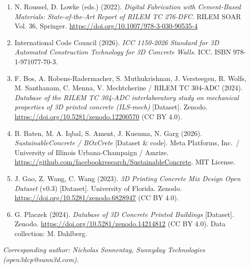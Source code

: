 \documentclass[
  11pt,
  letterpaper,
]{article}
\begin{document}
\begin{enumerate}
\item
  N. Roussel, D. Lowke (eds.) (2022). \emph{Digital Fabrication with
  Cement-Based Materials: State-of-the-Art Report of RILEM TC 276-DFC.}
  RILEM SOAR Vol. 36, Springer.
  \url{https://doi.org/10.1007/978-3-030-90535-4}
\item
  International Code Council (2026). \emph{ICC 1150-2026 Standard for 3D
  Automated Construction Technology for 3D Concrete Walls.} ICC. ISBN
  978-1-971077-70-3.
\item
  F. Bos, A. Robens-Radermacher, S. Muthukrishnan, J. Versteegen, R.
  Wolfs, M. Santhanam, C. Menna, V. Mechtcherine / RILEM TC 304-ADC
  (2024). \emph{Database of the RILEM TC 304-ADC interlaboratory study
  on mechanical properties of 3D printed concrete (ILS-mech)}
  {[}Dataset{]}. Zenodo. \url{https://doi.org/10.5281/zenodo.12200570}
  (CC BY 4.0).
\item
  B. Baten, M. A. Iqbal, S. Ament, J. Kusuma, N. Garg (2026).
  \emph{SustainableConcrete / BOxCrete} {[}Dataset \& code{]}. Meta
  Platforms, Inc.~/ University of Illinois Urbana-Champaign / Amrize.
  \url{https://github.com/facebookresearch/SustainableConcrete}. MIT
  License.
\item
  J. Gao, Z. Wang, C. Wang (2023). \emph{3D Printing Concrete Mix Design
  Open Dataset} (v0.3) {[}Dataset{]}. University of Florida. Zenodo.
  \url{https://doi.org/10.5281/zenodo.6828947} (CC BY 4.0).
\item
  G. Placzek (2024). \emph{Database of 3D Concrete Printed Buildings}
  {[}Dataset{]}. Zenodo. \url{https://doi.org/10.5281/zenodo.14214812}
  (CC BY 4.0). Data collection: M. Dahlberg.
\end{enumerate}

\emph{Corresponding author: Nicholas Sonnentag, Sunnyday Technologies
(open3dcp@sunn3d.com).}
\end{document}
